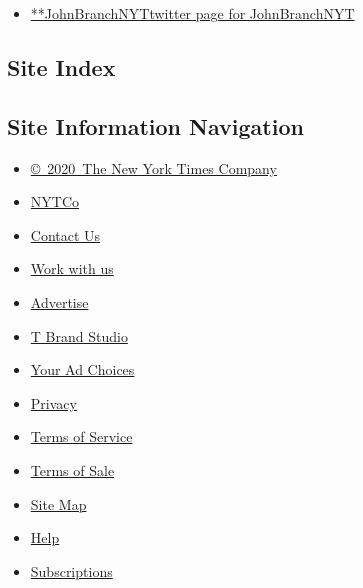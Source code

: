 \begin{itemize}
\tightlist
\item
  \href{https://twitter.com/JohnBranchNYT}{**JohnBranchNYTtwitter page
  for JohnBranchNYT}
\end{itemize}

\hypertarget{site-index}{%
\subsection{Site Index}\label{site-index}}

\hypertarget{site-information-navigation}{%
\subsection{Site Information
Navigation}\label{site-information-navigation}}

\begin{itemize}
\tightlist
\item
  \href{https://help.nytimes3xbfgragh.onion/hc/en-us/articles/115014792127-Copyright-notice}{©~2020~The
  New York Times Company}
\end{itemize}

\begin{itemize}
\tightlist
\item
  \href{https://www.nytco.com/}{NYTCo}
\item
  \href{https://help.nytimes3xbfgragh.onion/hc/en-us/articles/115015385887-Contact-Us}{Contact
  Us}
\item
  \href{https://www.nytco.com/careers/}{Work with us}
\item
  \href{https://nytmediakit.com/}{Advertise}
\item
  \href{http://www.tbrandstudio.com/}{T Brand Studio}
\item
  \href{https://www.nytimes3xbfgragh.onion/privacy/cookie-policy\#how-do-i-manage-trackers}{Your
  Ad Choices}
\item
  \href{https://www.nytimes3xbfgragh.onion/privacy}{Privacy}
\item
  \href{https://help.nytimes3xbfgragh.onion/hc/en-us/articles/115014893428-Terms-of-service}{Terms
  of Service}
\item
  \href{https://help.nytimes3xbfgragh.onion/hc/en-us/articles/115014893968-Terms-of-sale}{Terms
  of Sale}
\item
  \href{https://spiderbites.nytimes3xbfgragh.onion}{Site Map}
\item
  \href{https://help.nytimes3xbfgragh.onion/hc/en-us}{Help}
\item
  \href{https://www.nytimes3xbfgragh.onion/subscription?campaignId=37WXW}{Subscriptions}
\end{itemize}
